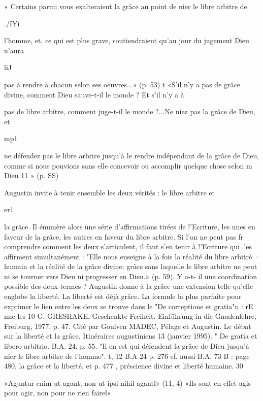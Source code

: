 « Certains parmi vous exalteraient la grâce au point de nier le libre arbitre de
 

./IYi
 
l'homme, et, ce qui est plus grave, soutiendraient qu'au jour du jugement Dieu n'aura
 
liJ
 
pas à rendre à chacun selon ses oeuvres...» (p. 53)	t
«S'il n'y a pas de grâce divine, comment Dieu sauve-t-il le monde ? Et s'il n'y a	à
 
pas de libre arbitre, comment juge-t-il le monde ?...Ne niez pas la grâce de Dieu, et
 
mp1
 
ne défendez pas le libre arbitre jusqu'à le rendre indépendant de la grâce de Dieu,
comme	si nous pouvions sans elle concevoir	ou	accomplir quelque chose	selon	m
Dieu 11     » (p.  SS)

 
Augustin invite à tenir ensemble les deux vérités : le libre arbitre	et
 

er1
 
la grâce. Il énumère alors une série d'affirmations tirées de !'Ecriture, les unes en
faveur de la grâce, les autres en faveur du libre arbitre. Si l'on ne peut pas	fr
comprendre comment les deux s'articulent, il faut s'en tenir à !'Ecriture qui .les
affirment simultanément : "Elle nous enseigne à la fois la réalité du libre arbitré · humain et la réalité de la grâce divine; grâce sans laquelle le libre arbitre ne peut ni se tourner vers Dieu ni progresser en Dieu.» (p. 59). Y a-t- il une coordination possible des deux termes ? Augustin donne à la grâce une extension telle qu'elle englobe la liberté. La liberté est déjà grâce. La formule la plus parfaite pour exprimer le lien
entre les deux se trouve dans le "De correptione et gratia"n :	rE
nne
les
10 G. GRESHAKE, Geschenkte Freiheit. Einführung in die Gnadenlehre, Freiburg, 1977, p.
47.	Cité par Goulven MADEC, Pélage et Augustin. Le débat sur la liberté et la grâce.
Itinéraires augustiniens 13 (janvier 1995).
" De gratia et libero arbitrio. B.A. 24, p. 55. "Il en est qui défendent la grâce de Dieu
jusqu'à nier le libre arbitre de l'homme".	t,
12 B.A 24 p. 276 cf. aussi B.A. 73 B : page 480, la grâce et la liberté, et p. 477 ,
préscience divine et liberté humaine.
30
 
«Aguntur  enim  ut	agant,  non  ut	ipsi nihil agantl» (11,  4)
«Ils sont en effet	agis pour agir, non pour ne rien fairel»

